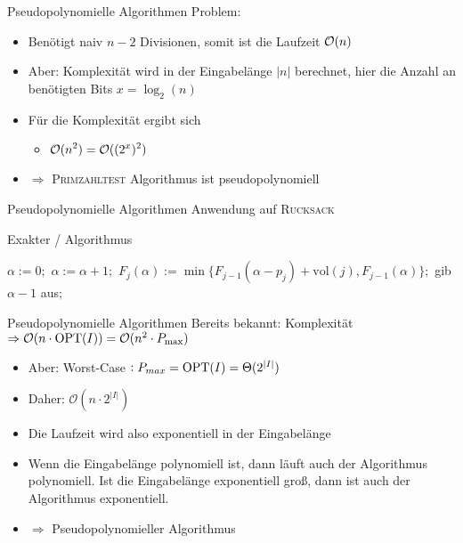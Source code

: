 \begin{frame}{Pseudopolynomielle Algorithmen}
	Problem:
	
	\begin{itemize}
		\item Benötigt naiv $n-2$ Divisionen, somit ist die Laufzeit $\mathcal{O}(n)$ 
		\item Aber: Komplexität wird in der Eingabelänge $|n|$ berechnet, hier die Anzahl an benötigten Bits $x = \log_2(n)$ 
		\item Für die Komplexität ergibt sich
		\begin{itemize}
			\item $\displaystyle \mathcal{O}(n^2) = \mathcal{O}((2^x)^2)$
		\end{itemize}
		\item $\Rightarrow$ \textsc{Primzahltest} Algorithmus ist pseudopolynomiell
	\end{itemize}
\end{frame}

\begin{frame}{Pseudopolynomielle Algorithmen}
Anwendung auf \textsc{Rucksack}
\newline

\begin{algorithm}[H]
    \caption{Exakter \rucksack/ Algorithmus}
        \begin{algorithmic}
            \State $\alpha:=0;$
            \Repeat
            \State $\alpha:=\alpha+1;$
            \State $F_j(\alpha):=\min\{F_{j-1}(\alpha-p_j)+\text{vol}(j),F_{j-1}(\alpha)\};$
            \EndFor
            \State gib $\alpha-1$ aus$;$
        \end{algorithmic}
\end{algorithm}

\end{frame}

\begin{frame}{Pseudopolynomielle Algorithmen}
Bereits bekannt: Komplexität $\Rightarrow \mathcal{O}( n \cdot \operatorname{OPT}(I)) = \mathcal{O}( n^2 \cdot P_{\max})$ 
\begin{itemize}
	\item
	Aber: Worst-Case $: P_{max} = \operatorname{OPT}(I) = \Theta(2^{|I|})$
	\item
	Daher: 
	$\mathcal{O}(n\cdot 2^{|I|})$
	\item
	Die Laufzeit wird also exponentiell in der Eingabelänge
	\item
	Wenn die Eingabelänge polynomiell ist, dann läuft auch der Algorithmus polynomiell. Ist die Eingabelänge exponentiell groß, dann ist auch der Algorithmus exponentiell.
	\item $\Rightarrow$ Pseudopolynomieller Algorithmus
\end{itemize}

\end{frame}

